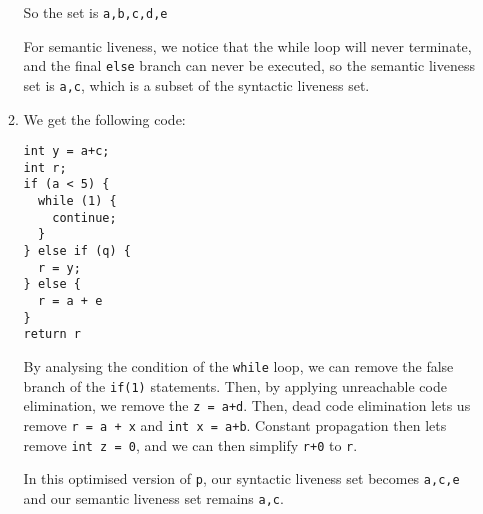 \begin{enumerate}[label=(\alph*)]
\begin{enumerate}[label=(\roman*)]
\begin{verbatim}
\end{verbatim}

So the set is \texttt{a,b,c,d,e}

For semantic liveness, we notice that the while loop will never terminate, and the final \texttt{else} branch can never be executed, so the semantic liveness set is \texttt{a,c}, which is a subset of the syntactic liveness set.

\item
  We get the following code:

\begin{verbatim}
int y = a+c;
int r;    
if (a < 5) { 
  while (1) {
    continue;
  }
} else if (q) {  
  r = y;        
} else {
  r = a + e    
} 
return r
\end{verbatim}

By analysing the condition of the \texttt{while} loop, we can remove the false branch of the \texttt{if(1)} statements. Then, by applying unreachable code elimination, we remove the \texttt{z = a+d}. Then, dead code elimination lets us remove \texttt{r = a + x} and \texttt{int x = a+b}. Constant propagation then lets  remove \texttt{int z = 0}, and we can then simplify \texttt{r+0} to \texttt{r}.

In this optimised version of \texttt{p}, our syntactic liveness set becomes \texttt{a,c,e} and our semantic liveness set remains \texttt{a,c}.

      
  \end{enumerate}


        
\end{enumerate}

